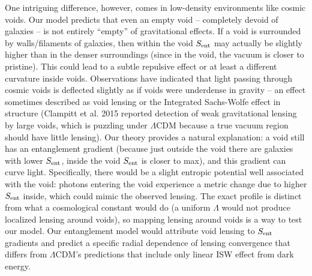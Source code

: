\documentclass[11pt]{article}
\begin{document}
One intriguing difference, however, comes in low-density environments like cosmic voids. Our model predicts that even an empty void – completely devoid of galaxies – is not entirely “empty” of gravitational effects. If a void is surrounded by walls/filaments of galaxies, then within the void $S_{\rm ent}$ may actually be slightly higher than in the denser surroundings (since in the void, the vacuum is closer to pristine). This could lead to a subtle repulsive effect or at least a different curvature inside voids. Observations have indicated that light passing through cosmic voids is deflected slightly as if voids were underdense in gravity – an effect sometimes described as void lensing or the Integrated Sachs-Wolfe effect in structure (Clampitt et al. 2015 reported detection of weak gravitational lensing by large voids, which is puzzling under $\Lambda$CDM because a true vacuum region should have little lensing). Our theory provides a natural explanation: a void still has an entanglement gradient (because just outside the void there are galaxies with lower $S_{\rm ent}$, inside the void $S_{\rm ent}$ is closer to max), and this gradient can curve light. Specifically, there would be a slight entropic potential well associated with the void: photons entering the void experience a metric change due to higher $S_{\rm ent}$ inside, which could mimic the observed lensing​. The exact profile is distinct from what a cosmological constant would do (a uniform $\Lambda$ would not produce localized lensing around voids), so mapping lensing around voids is a way to test our model. Our entanglement model would attribute void lensing to $S_{\rm ent}$ gradients and predict a specific radial dependence of lensing convergence that differs from $\Lambda$CDM’s predictions that include only linear ISW effect from dark energy​.
\end{document}
